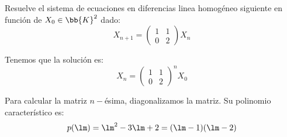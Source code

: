 \begin{ejemplo}
    Resuelve el sistema de ecuaciones en diferencias linea homogéneo siguiente en función de $X_0\in \bb{K}^2$ dado:
    \begin{equation*}
        X_{n+1} = \left(
        \begin{array}{cc}
            1 & 1\\
            0 & 2
        \end{array}
        \right)X_n
    \end{equation*}

    Tenemos que la solución es:
    \begin{equation*}
        X_{n} = \left(
        \begin{array}{cc}
            1 & 1\\
            0 & 2
        \end{array}
        \right)^nX_0
    \end{equation*}

    Para calcular la matriz $n-$ésima, diagonalizamos la matriz. Su polinomio característico es:
    \begin{equation*}
        p(\lm) = \lm^2-3\lm + 2 = (\lm-1)(\lm-2)
    \end{equation*}


\end{ejemplo}

